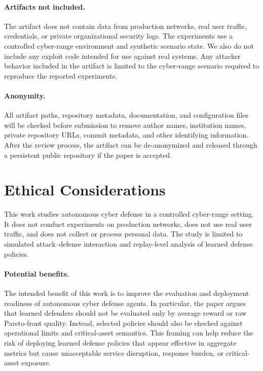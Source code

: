 \documentclass[sigconf,review,anonymous]{acmart}
\begin{document}
\paragraph{Artifacts not included.}
The artifact does not contain data from production networks, real user
traffic, credentials, or private organizational security logs. The
experiments use a controlled cyber-range environment and synthetic
scenario state. We also do not include any exploit code intended for use
against real systems. Any attacker behavior included in the artifact is
limited to the cyber-range scenario required to reproduce the reported
experiments.

\paragraph{Anonymity.}
All artifact paths, repository metadata, documentation, and configuration
files will be checked before submission to remove author names,
institution names, private repository URLs, commit metadata, and other
identifying information. After the review process, the artifact can be
de-anonymized and released through a persistent public repository if the
paper is accepted.

\section{Ethical Considerations}
\label{app:ethical-considerations}

This work studies autonomous cyber defense in a controlled cyber-range
setting. It does not conduct experiments on production networks, does
not use real user traffic, and does not collect or process personal data.
The study is limited to simulated attack--defense interaction and
replay-level analysis of learned defense policies.

\paragraph{Potential benefits.}
The intended benefit of this work is to improve the evaluation and
deployment readiness of autonomous cyber defense agents. In particular,
the paper argues that learned defenders should not be evaluated only by
average reward or raw Pareto-front quality. Instead, selected policies
should also be checked against operational limits and critical-asset
semantics. This framing can help reduce the risk of deploying learned
defense policies that appear effective in aggregate metrics but cause
unacceptable service disruption, response burden, or critical-asset
exposure.
\end{document}
